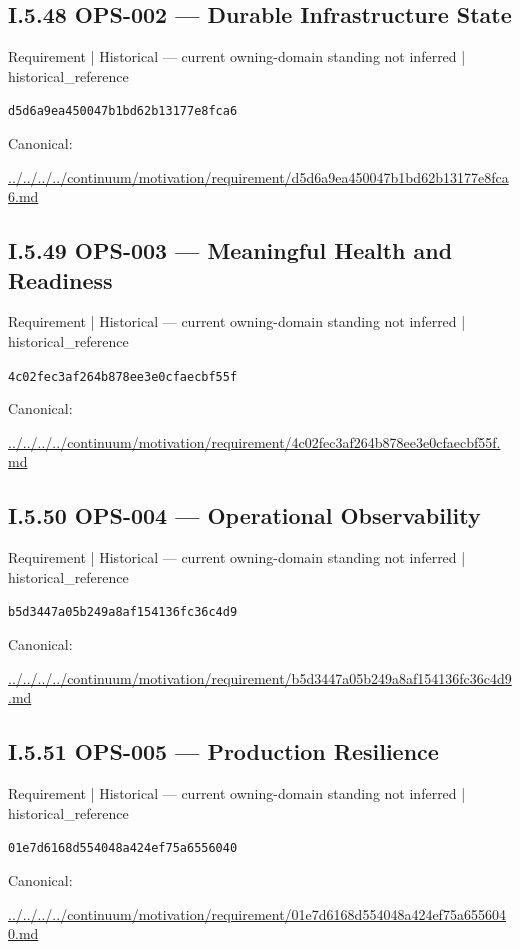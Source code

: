 \documentclass[10pt,a4paper]{article}
\begin{document}
\subsection*{I.5.48 OPS-002 — Durable Infrastructure State}
\label{element-d5d6a9ea450047b1bd62b13177e8fca6}
{\small Requirement | Historical — current owning-domain standing not inferred | historical\_reference}\par
\texttt{d5d6a9ea450047b1bd62b13177e8fca6}\par
Canonical: \par
{\footnotesize\url{../../../../continuum/motivation/requirement/d5d6a9ea450047b1bd62b13177e8fca6.md}}\par
\subsection*{I.5.49 OPS-003 — Meaningful Health and Readiness}
\label{element-4c02fec3af264b878ee3e0cfaecbf55f}
{\small Requirement | Historical — current owning-domain standing not inferred | historical\_reference}\par
\texttt{4c02fec3af264b878ee3e0cfaecbf55f}\par
Canonical: \par
{\footnotesize\url{../../../../continuum/motivation/requirement/4c02fec3af264b878ee3e0cfaecbf55f.md}}\par
\subsection*{I.5.50 OPS-004 — Operational Observability}
\label{element-b5d3447a05b249a8af154136fc36c4d9}
{\small Requirement | Historical — current owning-domain standing not inferred | historical\_reference}\par
\texttt{b5d3447a05b249a8af154136fc36c4d9}\par
Canonical: \par
{\footnotesize\url{../../../../continuum/motivation/requirement/b5d3447a05b249a8af154136fc36c4d9.md}}\par
\subsection*{I.5.51 OPS-005 — Production Resilience}
\label{element-01e7d6168d554048a424ef75a6556040}
{\small Requirement | Historical — current owning-domain standing not inferred | historical\_reference}\par
\texttt{01e7d6168d554048a424ef75a6556040}\par
Canonical: \par
{\footnotesize\url{../../../../continuum/motivation/requirement/01e7d6168d554048a424ef75a6556040.md}}\par
\end{document}
